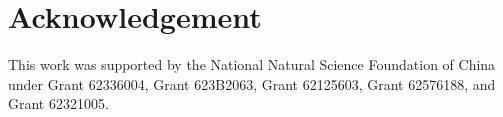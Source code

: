 \section{Acknowledgement}

This work was supported by the National Natural Science Foundation of China under Grant 62336004, Grant 623B2063, Grant 62125603, Grant 62576188, and Grant 62321005.

